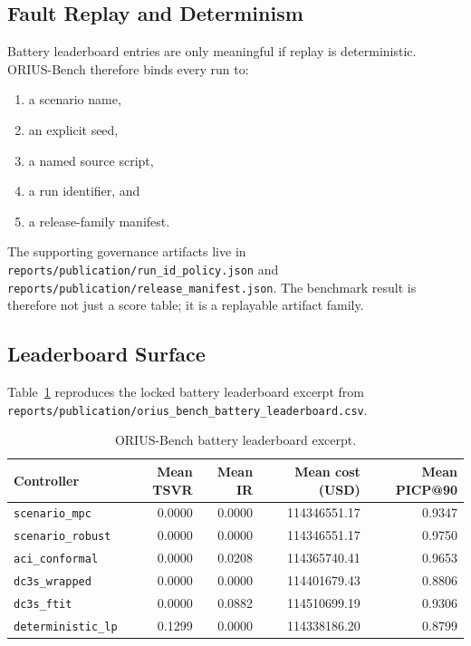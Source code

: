 \subsection{Fault Replay and Determinism}

Battery leaderboard entries are only meaningful if replay is deterministic.
ORIUS-Bench therefore binds every run to:

\begin{enumerate}
  \item a scenario name,
  \item an explicit seed,
  \item a named source script,
  \item a run identifier, and
  \item a release-family manifest.
\end{enumerate}

The supporting governance artifacts live in
\texttt{reports/publication/run\_id\_policy.json} and
\texttt{reports/publication/release\_manifest.json}.  The benchmark result is
therefore not just a score table; it is a replayable artifact family.

\subsection{Leaderboard Surface}

Table~\ref{tab:orius-bench-leaderboard} reproduces the locked battery
leaderboard excerpt from
\texttt{reports/publication/orius\_bench\_battery\_leaderboard.csv}.

\begin{table}[ht]
\centering
\caption{ORIUS-Bench battery leaderboard excerpt.}
\label{tab:orius-bench-leaderboard}
\begin{tabular}{lrrrr}
\toprule
\textbf{Controller} & \textbf{Mean TSVR} & \textbf{Mean IR} &
  \textbf{Mean cost (USD)} & \textbf{Mean PICP@90} \\
\midrule
\texttt{scenario\_mpc} & 0.0000 & 0.0000 & 114346551.17 & 0.9347 \\
\texttt{scenario\_robust} & 0.0000 & 0.0000 & 114346551.17 & 0.9750 \\
\texttt{aci\_conformal} & 0.0000 & 0.0208 & 114365740.41 & 0.9653 \\
\texttt{dc3s\_wrapped} & 0.0000 & 0.0000 & 114401679.43 & 0.8806 \\
\texttt{dc3s\_ftit} & 0.0000 & 0.0882 & 114510699.19 & 0.9306 \\
\texttt{deterministic\_lp} & 0.1299 & 0.0000 & 114338186.20 & 0.8799 \\
\bottomrule
\end{tabular}
\end{table}

